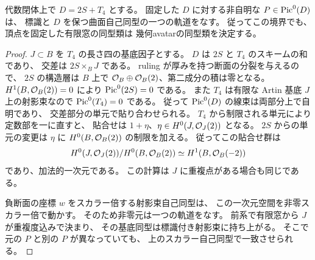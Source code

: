\begin{corollary}[重複負断面を含む幾何avatarの復元]
\label{cor:qa-avatar-double-negative-reconstruction}
代数閉体上で $D=2S+T_4$ とする。
固定した $D$ に対する非自明な $P\in\operatorname{Pic}^0(D)$ は、
標識と $D$ を保つ曲面自己同型の一つの軌道をなす。
従ってこの境界でも、頂点を固定した有限窓の同型類は
幾何avatarの同型類を決定する。
\end{corollary}
\begin{proof}
$J\subset B$ を $T_4$ の長さ四の基底因子とする。
$D$ は $2S$ と $T_4$ のスキームの和であり、
交差は $2S\times_B J$ である。
ruling が厚みを持つ断面の分裂を与えるので、
$2S$ の構造層は $B$ 上で
$\mathcal O_B\oplus\mathcal O_B(2)$、第二成分の積は零となる。
$H^1(B,\mathcal O_B(2))=0$ により $\operatorname{Pic}^0(2S)=0$ である。
また $T_4$ は有限な Artin 基底 $J$ 上の射影束なので
$\operatorname{Pic}^0(T_4)=0$ である。
従って $\operatorname{Pic}^0(D)$ の線束は両部分上で自明であり、
交差部分の単元で貼り合わせられる。
$T_4$ から制限される単元により定数部を一に直すと、
貼合せは $1+\eta$、$\eta\in H^0(J,\mathcal O_J(2))$ となる。
$2S$ からの単元の変更は $\eta$ に
$H^0(B,\mathcal O_B(2))$ の制限を加える。
従ってこの貼合せ群は
\[
 H^0(J,\mathcal O_J(2))/H^0(B,\mathcal O_B(2))
 \simeq H^1(B,\mathcal O_B(-2))
\]
であり、加法的一次元である。
この計算は $J$ に重複点がある場合も同じである。

負断面の座標 $w$ をスカラー倍する射影束自己同型は、
この一次元空間を非零スカラー倍で動かす。
そのため非零元は一つの軌道をなす。
前系で有限窓から $J$ が重複度込みで決まり、
その基底同型は標識付き射影束に持ち上がる。
そこで元の $P$ と別の $P$ が異なっていても、
上のスカラー自己同型で一致させられる。
\end{proof}

